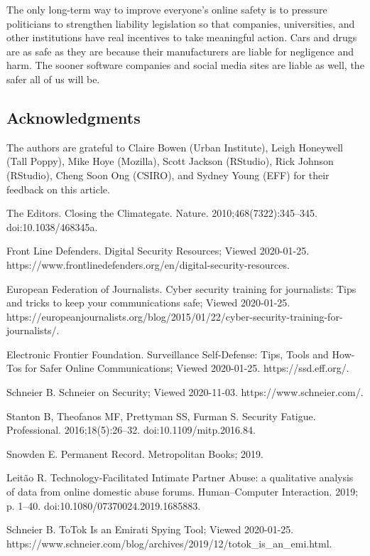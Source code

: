 \documentclass[10pt,letterpaper]{article}
\begin{document}
The only long-term way to improve everyone's online safety is to pressure
politicians to strengthen liability legislation so that companies, universities,
and other institutions have real incentives to take meaningful action. Cars and
drugs are as safe as they are because their manufacturers are liable for
negligence and harm. The sooner software companies and social media sites are
liable as well, the safer all of us will be.

\subsection*{Acknowledgments}

The authors are grateful to Claire Bowen (Urban Institute), Leigh Honeywell
(Tall Poppy), Mike Hoye (Mozilla), Scott Jackson (RStudio), Rick Johnson
(RStudio), Cheng Soon Ong (CSIRO), and Sydney Young (EFF) for their feedback on
this article.

% 

\begin{thebibliography}{1}

{The Editors}.
\newblock Closing the Climategate.
\newblock Nature. 2010;468(7322):345--345.
\newblock doi:{10.1038/468345a}.

{Front Line Defenders}. Digital Security Resources; Viewed 2020-01-25.
\newblock https://www.frontlinedefenders.org/en/digital-security-resources.

{European Federation of Journalists}. Cyber security training for journalists:
  Tips and tricks to keep your communications safe; Viewed 2020-01-25.
\newblock
  https://europeanjournalists.org/blog/2015/01/22/cyber-security-training-for-journalists/.

{Electronic Frontier Foundation}. Surveillance Self-Defense: Tips, Tools and
  How-Tos for Safer Online Communications; Viewed 2020-01-25.
\newblock https://ssd.eff.org/.

Schneier B. Schneier on Security; Viewed 2020-11-03.
\newblock https://www.schneier.com/.

Stanton B, Theofanos MF, Prettyman SS, Furman S.
\newblock Security Fatigue.
 Professional. 2016;18(5):26--32.
\newblock doi:{10.1109/mitp.2016.84}.

Snowden E.
\newblock Permanent Record.
\newblock Metropolitan Books; 2019.

Leit{\~{a}}o R.
\newblock Technology-Facilitated Intimate Partner Abuse: a qualitative analysis
  of data from online domestic abuse forums.
\newblock Human--Computer Interaction. 2019; p. 1--40.
\newblock doi:{10.1080/07370024.2019.1685883}.

Schneier B. ToTok Is an Emirati Spying Tool; Viewed 2020-01-25.
\newblock
  https://www.schneier.com/blog/archives/2019/12/totok\_is\_an\_emi.html.

\end{thebibliography}
\end{document}
